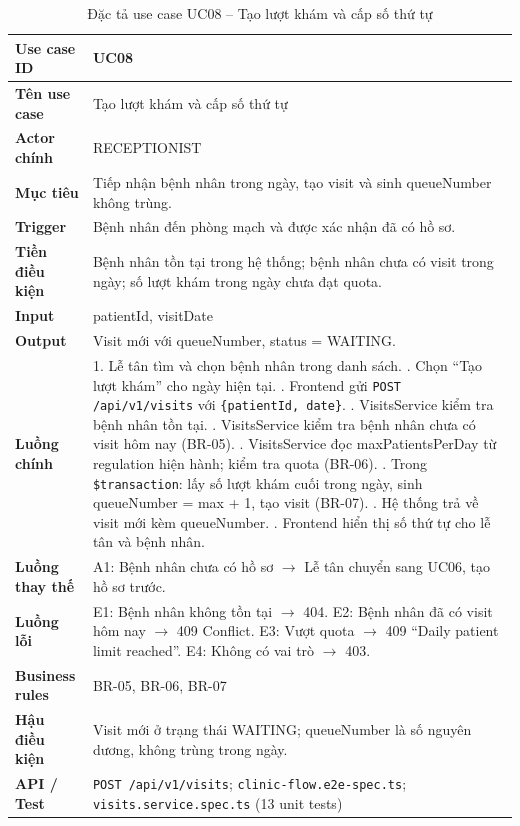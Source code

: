 \begin{table}[H]
\centering
\caption{Đặc tả use case UC08 -- Tạo lượt khám và cấp số thứ tự}
\label{tab:uc08}
\begin{tabularx}{\textwidth}{|p{3.6cm}|X|}
\hline
\textbf{Use case ID} & UC08 \\
\hline
\textbf{Tên use case} & Tạo lượt khám và cấp số thứ tự \\
\hline
\textbf{Actor chính} & RECEPTIONIST \\
\hline
\textbf{Mục tiêu} & Tiếp nhận bệnh nhân trong ngày, tạo visit và sinh queueNumber không trùng. \\
\hline
\textbf{Trigger} & Bệnh nhân đến phòng mạch và được xác nhận đã có hồ sơ. \\
\hline
\textbf{Tiền điều kiện} & Bệnh nhân tồn tại trong hệ thống; bệnh nhân chưa có visit trong ngày; số lượt khám trong ngày chưa đạt quota. \\
\hline
\textbf{Input} & patientId, visitDate \\
\hline
\textbf{Output} & Visit mới với queueNumber, status = WAITING. \\
\hline
\textbf{Luồng chính} &
1. Lễ tân tìm và chọn bệnh nhân trong danh sách. \newline
2. Chọn ``Tạo lượt khám'' cho ngày hiện tại. \newline
3. Frontend gửi \texttt{POST /api/v1/visits} với \texttt{\{patientId, date\}}. \newline
4. VisitsService kiểm tra bệnh nhân tồn tại. \newline
5. VisitsService kiểm tra bệnh nhân chưa có visit hôm nay (BR-05). \newline
6. VisitsService đọc maxPatientsPerDay từ regulation hiện hành; kiểm tra quota (BR-06). \newline
7. Trong \verb|$transaction|: lấy số lượt khám cuối trong ngày, sinh queueNumber = max + 1, tạo visit (BR-07). \newline
8. Hệ thống trả về visit mới kèm queueNumber. \newline
9. Frontend hiển thị số thứ tự cho lễ tân và bệnh nhân. \\
\hline
\textbf{Luồng thay thế} & A1: Bệnh nhân chưa có hồ sơ $\rightarrow$ Lễ tân chuyển sang UC06, tạo hồ sơ trước. \\
\hline
\textbf{Luồng lỗi} & E1: Bệnh nhân không tồn tại $\rightarrow$ 404. E2: Bệnh nhân đã có visit hôm nay $\rightarrow$ 409 Conflict. E3: Vượt quota $\rightarrow$ 409 ``Daily patient limit reached''. E4: Không có vai trò $\rightarrow$ 403. \\
\hline
\textbf{Business rules} & BR-05, BR-06, BR-07 \\
\hline
\textbf{Hậu điều kiện} & Visit mới ở trạng thái WAITING; queueNumber là số nguyên dương, không trùng trong ngày. \\
\hline
\textbf{API / Test} & \texttt{POST /api/v1/visits}; \texttt{clinic-flow.e2e-spec.ts}; \texttt{visits.service.spec.ts} (13 unit tests) \\
\hline
\end{tabularx}
\end{table}

